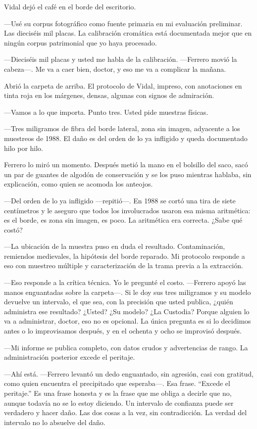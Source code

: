 Vidal dejó el café en el borde del escritorio.

---Usé su corpus fotográfico como fuente primaria en mi evaluación preliminar. Las dieciséis mil placas. La calibración cromática está documentada mejor que en ningún corpus patrimonial que yo haya procesado.

---Dieciséis mil placas y usted me habla de la calibración. ---Ferrero movió la cabeza---. Me va a caer bien, doctor, y eso me va a complicar la mañana.

Abrió la carpeta de arriba. El protocolo de Vidal, impreso, con anotaciones en tinta roja en los márgenes, densas, algunas con signos de admiración.

---Vamos a lo que importa. Punto tres. Usted pide muestras físicas.

---Tres miligramos de fibra del borde lateral, zona sin imagen, adyacente a los muestreos de 1988. El daño es del orden de lo ya infligido y queda documentado hilo por hilo.

Ferrero lo miró un momento. Después metió la mano en el bolsillo del saco, sacó un par de guantes de algodón de conservación y se los puso mientras hablaba, sin explicación, como quien se acomoda los anteojos.

---Del orden de lo ya infligido ---repitió---. En 1988 se cortó una tira de siete centímetros y le aseguro que todos los involucrados usaron esa misma aritmética: es el borde, es zona sin imagen, es poco. La aritmética era correcta. ¿Sabe qué costó?

---La ubicación de la muestra puso en duda el resultado. Contaminación, remiendos medievales, la hipótesis del borde reparado. Mi protocolo responde a eso con muestreo múltiple y caracterización de la trama previa a la extracción.

---Eso responde a la crítica técnica. Yo le pregunté el costo. ---Ferrero apoyó las manos enguantadas sobre la carpeta---. Si le doy sus tres miligramos y su modelo devuelve un intervalo, el que sea, con la precisión que usted publica, ¿quién administra ese resultado? ¿Usted? ¿Su modelo? ¿La Custodia? Porque alguien lo va a administrar, doctor, eso no es opcional. La única pregunta es si lo decidimos antes o lo improvisamos después, y en el ochenta y ocho se improvisó después.

---Mi informe se publica completo, con datos crudos y advertencias de rango. La administración posterior excede el peritaje.

---Ahí está. ---Ferrero levantó un dedo enguantado, sin agresión, casi con gratitud, como quien encuentra el precipitado que esperaba---. Esa frase. ``Excede el peritaje.'' Es una frase honesta y es la frase que me obliga a decirle que no, aunque todavía no se lo estoy diciendo. Un intervalo de confianza puede ser verdadero y hacer daño. Las dos cosas a la vez, sin contradicción. La verdad del intervalo no lo absuelve del daño.

